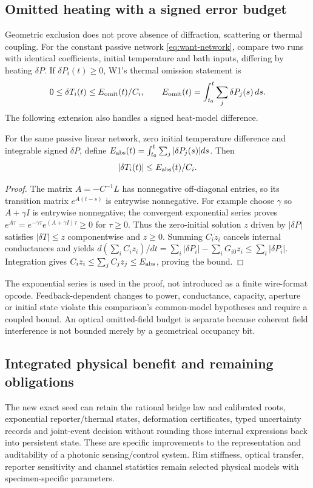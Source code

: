 \subsection{Omitted heating with a signed error budget}
Geometric exclusion does not prove absence of diffraction, scattering or
thermal coupling. For the constant passive network
\eqref{eq:want-network}, compare two runs with identical coefficients,
initial temperature and bath inputs, differing by heating $\delta P$.
If $\delta P_i(t)\ge0$, W1's thermal omission statement is
\begin{equation}
 0\le\delta T_i(t)\le E_{\rm omit}(t)/C_i,\qquad
 E_{\rm omit}(t)=\int_{t_0}^t\sum_j\delta P_j(s)\,ds.
\end{equation}
The following extension also handles a signed heat-model difference.
\begin{proposition}
For the same passive linear network, zero initial temperature difference
and integrable signed $\delta P$, define
$E_{\rm abs}(t)=\int_{t_0}^t\sum_j|\delta P_j(s)|ds$. Then
\begin{equation}
 |\delta T_i(t)|\le E_{\rm abs}(t)/C_i.
\end{equation}
\end{proposition}
\begin{proof}
The matrix $A=-C^{-1}L$ has nonnegative off-diagonal entries, so its transition
matrix $e^{A(t-s)}$ is entrywise nonnegative. For example choose $\gamma$
so $A+\gamma I$ is entrywise nonnegative; the convergent exponential series
proves $e^{A\tau}=e^{-\gamma\tau}e^{(A+\gamma I)\tau}\ge0$ for $\tau\ge0$.
Thus the zero-initial solution $z$ driven by $|\delta P|$ satisfies
$|\delta T|\le z$ componentwise and $z\ge0$.
Summing $C_i\dot z_i$ cancels internal conductances and yields
$d(\sum_iC_iz_i)/dt=\sum_i|\delta P_i|-\sum_iG_{i0}z_i
\le\sum_i|\delta P_i|$. Integration gives
$C_iz_i\le\sum_jC_jz_j\le E_{\rm abs}$, proving the bound.
\end{proof}
The exponential series is used in the proof, not introduced as a finite
wire-format opcode. Feedback-dependent changes to power, conductance,
capacity, aperture or initial state violate this comparison's common-model
hypotheses and require a coupled bound. An optical omitted-field budget is
separate because coherent field interference is not bounded merely by a
geometrical occupancy bit.

\subsection{Integrated physical benefit and remaining obligations}
The new exact seed can retain the rational bridge law and calibrated roots,
exponential reporter/thermal states, deformation certificates, typed
uncertainty records and joint-event decision without rounding those internal
expressions back into persistent state. These are specific improvements to
the representation and auditability of a photonic sensing/control system.
Rim stiffness, optical transfer, reporter sensitivity and channel statistics
remain selected physical models with specimen-specific parameters.

